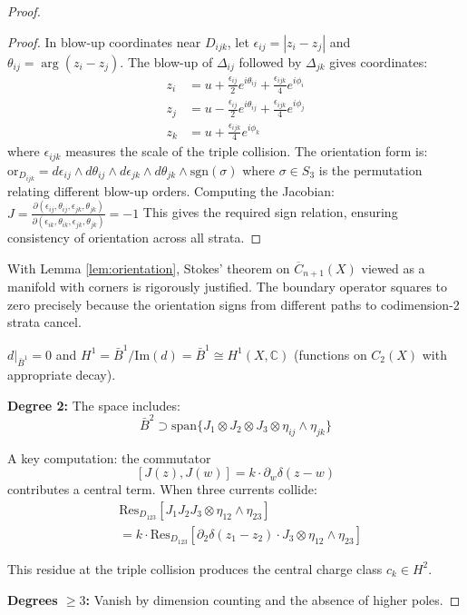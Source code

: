 \begin{proof}
\begin{proof}
In blow-up coordinates near $D_{ijk}$, let $\epsilon_{ij} = |z_i - z_j|$ and $\theta_{ij} = \arg(z_i - z_j)$. The blow-up of $\Delta_{ij}$ followed by $\Delta_{jk}$ gives coordinates:
\begin{align}
z_i &= u + \frac{\epsilon_{ij}}{2}e^{i\theta_{ij}} + \frac{\epsilon_{ijk}}{4}e^{i\phi_i}\\
z_j &= u - \frac{\epsilon_{ij}}{2}e^{i\theta_{ij}} + \frac{\epsilon_{ijk}}{4}e^{i\phi_j}\\
z_k &= u + \frac{\epsilon_{ijk}}{4}e^{i\phi_k}
\end{align}
where $\epsilon_{ijk}$ measures the scale of the triple collision. The orientation form is:
$\text{or}_{D_{ijk}} = d\epsilon_{ij} \wedge d\theta_{ij} \wedge d\epsilon_{jk} \wedge d\theta_{jk} \wedge \text{sgn}(\sigma)$
where $\sigma \in S_3$ is the permutation relating different blow-up orders. Computing the Jacobian:
$J = \frac{\partial(\epsilon_{ij}, \theta_{ij}, \epsilon_{jk}, \theta_{jk})}{\partial(\epsilon_{ik}, \theta_{ik}, \epsilon_{jk}, \theta_{jk})} = -1$
This gives the required sign relation, ensuring consistency of orientation across all strata.
\end{proof}

\begin{remark}
With Lemma \ref{lem:orientation}, Stokes' theorem on $\overline{C}_{n+1}(X)$ viewed as a manifold with corners is rigorously justified. The boundary operator squares to zero precisely because the orientation signs from different paths to codimension-2 strata cancel.
\end{remark}

$d|_{\bar{B}^1} = 0$
and $H^1 = \bar{B}^1/\text{Im}(d) = \bar{B}^1 \cong H^1(X, \mathbb{C})$ (functions on $C_2(X)$ with appropriate decay).
 
\textbf{Degree 2:} The space includes:
\[
\bar{B}^2 \supset \text{span}\{J_1 \otimes J_2 \otimes J_3 \otimes \eta_{ij} \wedge \eta_{jk}\}
\]
 
A key computation: the commutator
\[
[J(z), J(w)] = k \cdot \partial_w\delta(z-w)
\]
contributes a central term. When three currents collide:
\begin{align}
&\text{Res}_{D_{123}}[J_1J_2J_3 \otimes \eta_{12} \wedge \eta_{23}] \\
&= k \cdot \text{Res}_{D_{123}}[\partial_2\delta(z_1-z_2) \cdot J_3 \otimes \eta_{12} \wedge \eta_{23}]
\end{align}
 
This residue at the triple collision produces the central charge class $c_k \in H^2$.
 
\textbf{Degrees $\geq 3$:} Vanish by dimension counting and the absence of higher poles.
\end{proof}
 
